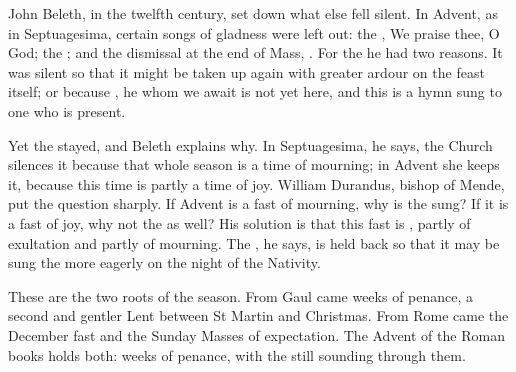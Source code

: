John Beleth, in the twelfth century, set down what else fell silent. In Advent,
as in Septuagesima, certain songs of gladness were left out: the , We praise thee, O God; the ; and the
dismissal at the end of Mass, . For the  he
had two reasons. It was silent so that it might be taken up again with greater
ardour on the feast itself; or because , he whom we await is not yet here, and this is a hymn sung to one
who is present.

Yet the  stayed, and Beleth explains why. In Septuagesima, he says,
the Church silences it because that whole season is a time of mourning; in
Advent she keeps it, because this time is partly a time of joy. William
Durandus, bishop of Mende, put the question sharply. If Advent is a fast of
mourning, why is the  sung? If it is a fast of joy, why not the
 as well? His solution is that this fast is , partly of exultation and partly of mourning.
The , he says, is held back so that it may be sung the more
eagerly on the night of the Nativity.

These are the two roots of the season. From Gaul came weeks of penance, a
second and gentler Lent between St Martin and Christmas. From Rome came the
December fast and the Sunday Masses of expectation. The Advent of the Roman
books holds both: weeks of penance, with the  still sounding
through them.
